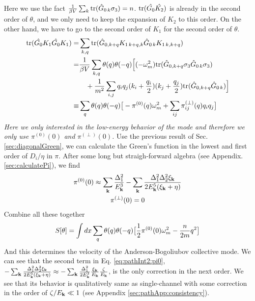 Here we use the fact $\frac{1}{{\beta{}V}}\sum_{k}\text{tr}(\hat{G}_{0\,k}\sigma_3)=n$. $\text{tr}(\hat{G_{0}}\hat{K_2})$ is already in the second order of $\theta$, and we only need to keep the expansion of $K_2$ to this order. On the other hand, we have to go to the second order of $K_1$ for the second order of $\theta$. 
\begin{align}		
\text{tr}(\hat{G_{0}}{K_1}\hat{G_{0}}{K_1})=&\sum_{k,q}\text{tr}(\hat{G}_{0,k+q}K_{1\,k+q,k}\hat{G}_{0\,k}K_{1\,k,k+q})\\
=&\frac{1}{{\beta{}V}}\sum_{k,q}\theta(q)\theta(-q)\Big[(-\omega_m^2)\text{tr}(\hat{G}_{0,k+q}\sigma_3\hat{G}_{0\,k}\sigma_3)\nonumber\\
&\quad+\frac{1}{m^2}\sum_{i,j}q_iq_j(k_i+\frac{q_i}{2})(k_j+\frac{q_j}{2})\text{tr}(\hat{G}_{0,k+q}\hat{G}_{0\,k})\Big]\nonumber\\
\equiv&\sum_{q}\theta(q)\theta(-q)\big[-\pi^{(0)}(q)\omega_m^2+\sum_{ij}\pi^{(\perp)}_{ij}(q)q_iq_j\big]
\end{align}
\emph{Here we only interested in the low-energy behavior of the mode and therefore we only use $\pi^{(0)}(0)$ and $\pi^{(\perp)}(0)$.} Use the previous result of Sec. \ref{sec:diagonalGreen}, we can calculate the Green's function in the lowest and first order of $D_i/\eta$ in $\pi$.  After some long but straigh-forward algebra (see Appendix. \ref{sec:calculatePi}), we find
\begin{gather}
\pi^{(0)}(0)\approx\sum_{\mathbf{k}}\frac{\Delta_{1}^{2}}{E_{\mathbf{k}}^{3}}
	-\sum_{\mathbf{k}}\frac{\Delta_{1}^{2}\Delta_{2}^{2}\xi_{\mathbf{k}}}{2E_{\mathbf{k}}^{5}(\xi_{\mathbf{k}}+\eta)}
\label{eq:pathInt2:pi0}\\
\pi^{(\perp)}(0)=0
\end{gather}
Combine all these together
\begin{equation}
S[\theta]=\int{dx}\sum_{q}\theta(q)\theta(-q)\big[\frac{1}{2}\pi^{(0)}(0)\omega_m^2-\frac{n}{2m}q^2\big]
\end{equation}
And this determines the velocity of the Anderson-Bogoliubov collective mode.  We can see that  the second term in Eq. \eqref{eq:pathInt2:pi0}, $-\sum_{\mathbf{k}}\frac{\Delta_{1}^{2}\Delta_{2}^{2}\xi_{\mathbf{k}}}{2E_{\mathbf{k}}^{5}(\xi_{\mathbf{k}}+\eta)}\approx-\sum_{\mathbf{k}}\frac{\Delta_{1}^{2}}{2E_{\mathbf{k}}^{3}}\frac{\xi_{\mathbf{k}}}{E_{\mathbf{k}}}\frac{\zeta}{E_{\mathbf{k}}}$, is the only correction in the next order.  We see that its behavior is qualitatively same as  single-channel with some correction in the order of $\zeta/E_{\mathbf{k}}\ll1$ (see Appendix \ref{sec:pathApp:consistency}).


